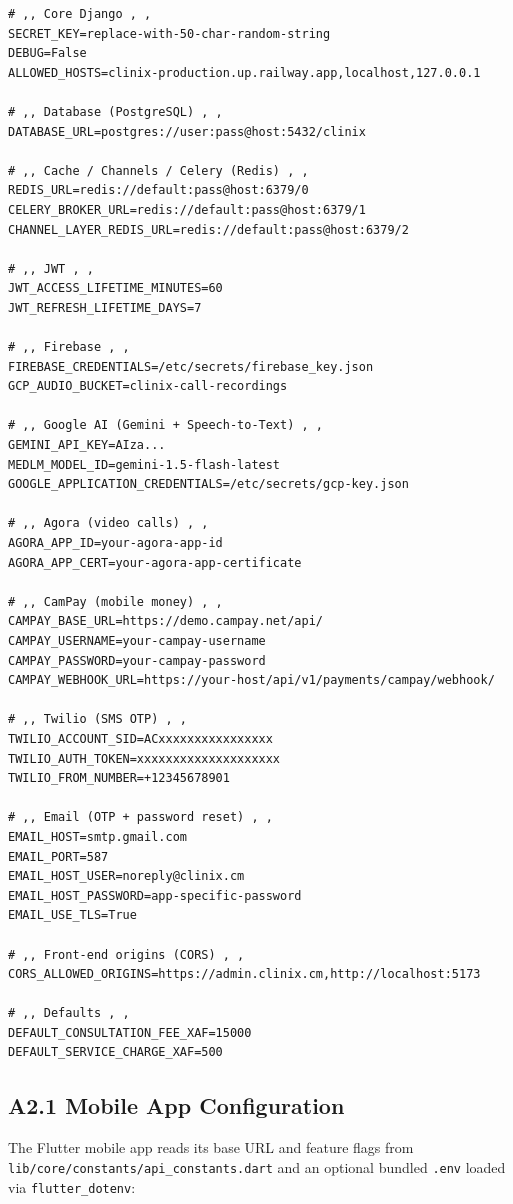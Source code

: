 \begin{lstlisting}[caption={Sample \texttt{.env} for the Clinix backend}]
# ,, Core Django , , 
SECRET_KEY=replace-with-50-char-random-string
DEBUG=False
ALLOWED_HOSTS=clinix-production.up.railway.app,localhost,127.0.0.1

# ,, Database (PostgreSQL) , , 
DATABASE_URL=postgres://user:pass@host:5432/clinix

# ,, Cache / Channels / Celery (Redis) , , 
REDIS_URL=redis://default:pass@host:6379/0
CELERY_BROKER_URL=redis://default:pass@host:6379/1
CHANNEL_LAYER_REDIS_URL=redis://default:pass@host:6379/2

# ,, JWT , , 
JWT_ACCESS_LIFETIME_MINUTES=60
JWT_REFRESH_LIFETIME_DAYS=7

# ,, Firebase , , 
FIREBASE_CREDENTIALS=/etc/secrets/firebase_key.json
GCP_AUDIO_BUCKET=clinix-call-recordings

# ,, Google AI (Gemini + Speech-to-Text) , , 
GEMINI_API_KEY=AIza...
MEDLM_MODEL_ID=gemini-1.5-flash-latest
GOOGLE_APPLICATION_CREDENTIALS=/etc/secrets/gcp-key.json

# ,, Agora (video calls) , , 
AGORA_APP_ID=your-agora-app-id
AGORA_APP_CERT=your-agora-app-certificate

# ,, CamPay (mobile money) , , 
CAMPAY_BASE_URL=https://demo.campay.net/api/
CAMPAY_USERNAME=your-campay-username
CAMPAY_PASSWORD=your-campay-password
CAMPAY_WEBHOOK_URL=https://your-host/api/v1/payments/campay/webhook/

# ,, Twilio (SMS OTP) , , 
TWILIO_ACCOUNT_SID=ACxxxxxxxxxxxxxxxx
TWILIO_AUTH_TOKEN=xxxxxxxxxxxxxxxxxxxx
TWILIO_FROM_NUMBER=+12345678901

# ,, Email (OTP + password reset) , , 
EMAIL_HOST=smtp.gmail.com
EMAIL_PORT=587
EMAIL_HOST_USER=noreply@clinix.cm
EMAIL_HOST_PASSWORD=app-specific-password
EMAIL_USE_TLS=True

# ,, Front-end origins (CORS) , , 
CORS_ALLOWED_ORIGINS=https://admin.clinix.cm,http://localhost:5173

# ,, Defaults , , 
DEFAULT_CONSULTATION_FEE_XAF=15000
DEFAULT_SERVICE_CHARGE_XAF=500
\end{lstlisting}

\subsection*{A2.1 Mobile App Configuration}

The Flutter mobile app reads its base URL and feature flags from
\texttt{lib/core/constants/api\_constants.dart} and an optional
bundled \texttt{.env} loaded via \texttt{flutter\_dotenv}:

